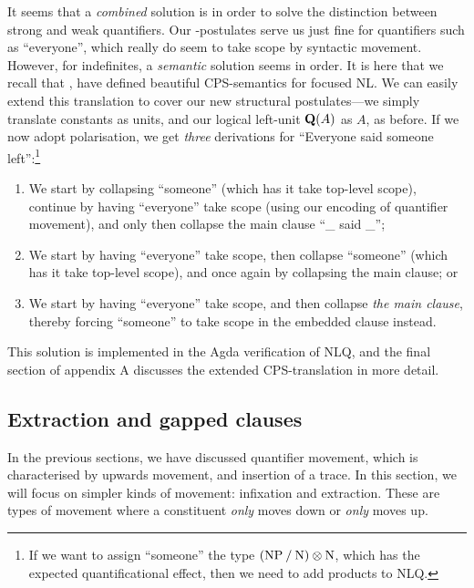 It seems that a \emph{combined} solution is in order to solve the
distinction between strong and weak quantifiers. Our \I\B\C-postulates
serve us just fine for quantifiers such as ``everyone'', which really
do seem to take scope by syntactic movement. However, for indefinites,
a \emph{semantic} solution seems in order.
It is here that we recall that \citet{bastenhof2012},
\citet{moortgat2012} have defined beautiful CPS-semantics for focused
NL.
We can easily extend this translation to cover our new structural
postulates---we simply translate constants as units, and our logical
left-unit $\q[A]$ as $A$, as before. If we now adopt
 polarisation, we get \emph{three} derivations
for ``Everyone said someone left'':\footnote{%
  If we want to assign ``someone'' the type $(\NP\impl\N)\otimes\N$,
  which has the expected quantificational effect, then we need to add
  products to NLQ.
}
\begin{enumerate}
\item We start by collapsing ``someone'' (which has it take top-level
  scope), continue by having ``everyone'' take scope (using our
  encoding of quantifier movement), and only then collapse the main
  clause ``\_ said \_'';
\item We start by having ``everyone'' take scope, then collapse
  ``someone'' (which has it take top-level scope), and once again by
  collapsing the main clause; or
\item We start by having ``everyone'' take scope, and then collapse
  \emph{the main clause}, thereby forcing ``someone'' to take scope in
  the embedded clause instead.
\end{enumerate}
This solution is implemented in the Agda verification of NLQ, and the
final section of appendix A discusses the extended CPS-translation in
more detail.

\subsection{Extraction and gapped clauses}
In the previous sections, we have discussed quantifier movement, which
is characterised by upwards movement, and insertion of a trace. In
this section, we will focus on simpler kinds of movement: infixation
and extraction. These are types of movement where a constituent
\emph{only} moves down or \emph{only} moves up.


